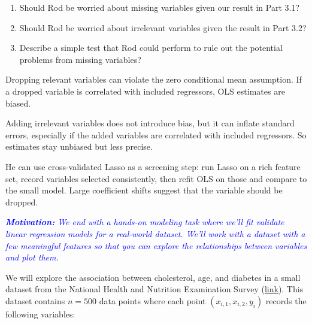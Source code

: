 \documentclass{article}
\begin{document}
\begin{probset}
\begin{prob} 
\begin{subprobset}
\begin{subprob}
            \begin{enumerate}[label=\roman*.]
                \item Should Rod be worried about missing variables given our result in Part 3.1?
                \item Should Rod be worried about irrelevant variables given the result in Part 3.2?
                \item Describe a simple test that Rod could perform to rule out the potential problems from missing variables?
            \end{enumerate}

            \begin{soln}
                Dropping relevant variables can violate the zero conditional mean assumption. If a dropped variable is correlated with included regressors, OLS estimates are biased.

                Adding irrelevant variables does not introduce bias, but it can inflate standard errors, especially if the added variables are correlated with included regressors. So estimates stay unbiased but less precise.

                He can use cross-validated Lasso as a screening step: run Lasso on a rich feature set, record variables selected consistently, then refit OLS on those and compare to the small model. Large coefficient shifts suggest that the variable should be dropped.
            \end{soln}
        \end{subprob}
    \end{subprobset}
\end{prob}

\newpage

\begin{prob} 
    \textit{\textcolor{blue}{\textbf{Motivation:} We end with a hands-on modeling task where we'll fit validate linear regression models for
    a real-world dataset. We'll work with a dataset with a few meaningful features so that you can explore the
    relationships between variables and plot them.}}

    We will explore the association between cholesterol, age, and diabetes in a small dataset from the National Health and Nutrition Examination Survey (\href{https://www.dropbox.com/scl/fi/nv7j1y6yvdafke4tgahwk/chol_data.csv?rlkey=r0q2w3mlb7pcljavatbv71s1z&st=30oeue65&dl=0}{link}). This dataset contains $n = 500$ data points where each point $(x_{i,1}, x_{i,2}, y_i)$ records the following variables:


\end{prob}
\end{probset}
\end{document}

